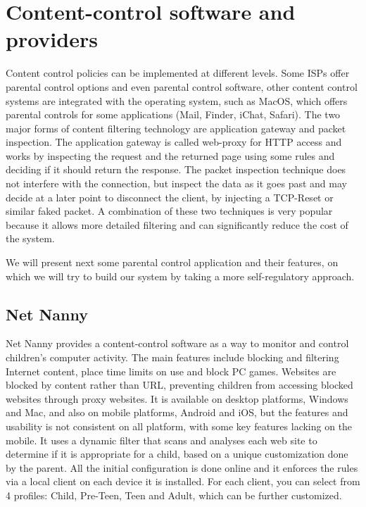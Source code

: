 
\chapter{Content-control software and providers} %

\label{Chapter2} %

Content control policies can be implemented at different levels. Some ISPs offer parental control options and even parental control software, other content control systems are integrated with the operating system, such as MacOS, which offers parental controls for some applications (Mail, Finder, iChat, Safari). The two major forms of content filtering technology are application gateway and packet inspection. The application gateway is called web-proxy for HTTP access and works by inspecting the request and the returned page using some rules and deciding if it should return the response. The packet inspection technique does not interfere with the connection, but inspect the data as it goes past and may decide at a later point to disconnect the client, by injecting a TCP-Reset or similar faked packet. \citep{dharmapurikar2003deep} A combination of these two techniques is very popular because it allows more detailed filtering and can significantly reduce the cost of the system.

We will present next some parental control application and their features, on which we will try to build our system by taking a more self-regulatory approach.

\section{Net Nanny}

Net Nanny provides a content-control software as a way to monitor and control children's computer activity. The main features include blocking and filtering Internet content, place time limits on use and block PC games. Websites are blocked by content rather than URL, preventing children from accessing blocked websites through proxy websites. It is available on desktop platforms, Windows and Mac, and also on mobile platforms, Android and iOS, but the features and usability is not consistent on all platform, with some key features lacking on the mobile. It uses a dynamic filter that scans and analyses each web site to determine if it is appropriate for a child, based on a unique customization done by the parent. All the initial configuration is done online and it enforces the rules via a local client on each device it is installed. For each client, you can select from 4 profiles: Child, Pre-Teen, Teen and Adult, which can be further customized. \parencite{netNannyFeatures}

